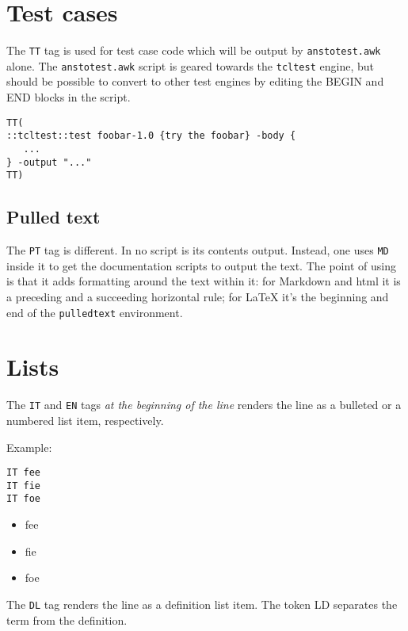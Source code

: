 \section{Test cases}
\label{test-cases}

The \texttt{TT} tag is used for test case code which will be output by \texttt{anstotest.awk} alone. The \texttt{anstotest.awk} script is geared towards the \texttt{tcltest} engine, but should be possible to convert to other test engines by editing the BEGIN and END blocks in the script.

\begin{verbatim}
TT(
::tcltest::test foobar-1.0 {try the foobar} -body {
   ...
} -output "..."
TT)
\end{verbatim}

\begin{pulledtext}
\section{Pulled text}
\label{pulled-text}

The \texttt{PT} tag is different. In no script is its contents output. Instead, one uses \texttt{MD} inside it to get the documentation scripts to output the text. The point of using is that it adds formatting around the text within it: for Markdown and html it is a preceding and a succeeding horizontal rule; for \LaTeX{} it's the beginning and end of the \texttt{pulledtext} environment.

\end{pulledtext}

\section{Lists}
\label{lists}

The \texttt{IT} and \texttt{EN} tags \emph{at the beginning of the line} renders the line as a bulleted or a numbered list item, respectively.


Example:

\begin{verbatim}
IT fee
IT fie
IT foe
\end{verbatim}
\begin{itemize}
\item  fee
\item  fie
\item  foe
\end{itemize}

The \texttt{DL} tag renders the line as a definition list item. The token LD separates the term from the definition.

